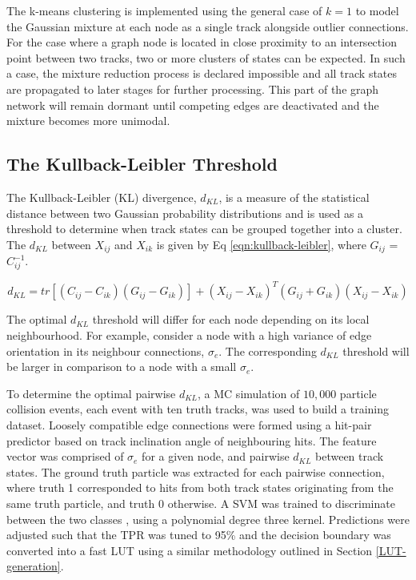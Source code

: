 The k-means clustering is implemented using the general case of $k=1$ to model the Gaussian mixture at each node as a single track alongside outlier connections. For the case where a graph node is located in close proximity to an intersection point between two tracks, two or more clusters of states can be expected. In such a case, the mixture reduction process is declared impossible and all track states are propagated to later stages for further processing. This part of the graph network will remain dormant until competing edges are deactivated and the mixture becomes more unimodal. 


\subsection{The Kullback-Leibler Threshold}
The Kullback-Leibler (KL) divergence, $d_{KL}$, is a measure of the statistical distance between two Gaussian probability distributions \cite{KL, FRUHWIRTH19971} and is used as a threshold to determine when track states can be grouped together into a cluster. The $d_{KL}$ between $X_{ij}$ and $X_{ik}$ is given by Eq \eqref{eqn:kullback-leibler}, where $G_{ij}$ = $C_{ij}^{-1}$.

\begin{equation}
    d_{KL} = tr[(C_{ij} - C_{ik})(G_{ij} - G_{ik})] + (X_{ij} - X_{ik})^{T}(G_{ij} + G_{ik})(X_{ij} - X_{ik})
    \label{eqn:kullback-leibler}
\end{equation}

The optimal $d_{KL}$ threshold will differ for each node depending on its local neighbourhood. For example, consider a node with a high variance of edge orientation in its neighbour connections, $\sigma_{e}$. The corresponding $d_{KL}$ threshold will be larger in comparison to a node with a small $\sigma_{e}$. 

To determine the optimal pairwise $d_{KL}$, a MC simulation of $10,000$ particle collision events, each event with ten truth tracks, was used to build a training dataset. Loosely compatible edge connections were formed using a hit-pair predictor based on track inclination angle of neighbouring hits. The feature vector was comprised of $\sigma_{e}$ for a given node, and pairwise $d_{KL}$ between track states. The ground truth particle was extracted for each pairwise connection, where truth 1 corresponded to hits from both track states originating from the same truth particle, and truth 0 otherwise. A SVM was trained to discriminate between the two classes \cite{scikit-learn}, using a polynomial degree three kernel. Predictions were adjusted such that the TPR was tuned to 95\% and the decision boundary was converted into a fast LUT using a similar methodology outlined in Section \ref{LUT-generation}. 

